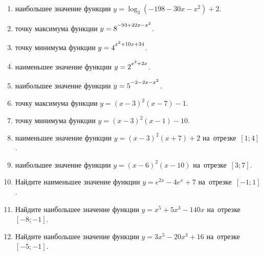 \documentclass[a4paper,10pt]{article}
\begin{document}
\begin{enumerate}
\item {} наибольшее значение функции $y=\log_3\left(-198-30x-x^2\right)+2$.

\item {} точку максимума функции $y=8\strut^{-93+22x-x^2}$.

\item {} точку минимума функции $y=4\strut^{x^2+10x+34}$.

\item {} наименьшее значение функции $y=2\strut^{x^2+2x}$.

\item {} наибольшее значение функции $y=5\strut^{-2-2x-x^2}$.

\item {} точку максимума функции $y=\left(x-3\right)^2\left(x-7\right)-1$.

\item {} точку минимума функции $y=\left(x-3\right)^2\left(x-1\right)-10$.

\item {} наименьшее значение функции $y=\left(x-3\right)^2\left(x+7\right)+2$ на~отрезке~$\left[1;4\right]$.

\item {} наибольшее значение функции $y=\left(x-6\right)^2\left(x-10\right)$ на~отрезке~$\left[3;7\right]$.

\item Найдите наименьшее значение функции $y=e^{2x}-4e^x+7$ на~отрезке~$\left[-1;1\right]$.

\item Найдите наибольшее значение функции $y=x^5+5x^3-140x$ на~отрезке~$\left[-8;-1\right]$.

\item Найдите наибольшее значение функции $y=3x^5-20x^3+16$ на~отрезке~$\left[-5;-1\right]$.

\end{enumerate}
\end{document}

